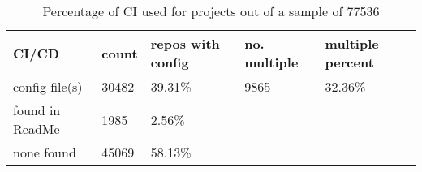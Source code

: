 
    \begin{table}[h]
\begin{tabular}{|l|l|l|l|l|}
\hline
    CI/CD & \textbf{count} & \textbf{repos with config} & \textbf{no. multiple} & \textbf{multiple percent}   \\ \hline
config file(s) &           30482     & 39.31\%                                & 9865          & 32.36\%             \\ \hline
found in ReadMe & 1985     & 2.56\%                                &             &             \\ \hline
none found &            45069     & 58.13\%                                &             &             \\ \hline
\end{tabular}
\caption[Percentage of CI used for projects]{Percentage of CI used for projects out of a sample of 77536 }
\label{table_ci_usage}
\end{table}
    